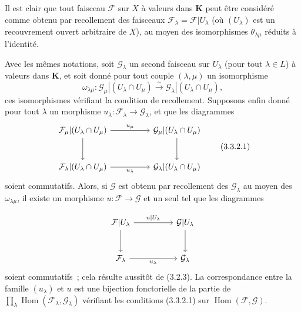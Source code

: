 \begin{env}[3.3.1]
Il est clair que tout faisceau $\mathcal{F}$ sur $X$ à valeurs dans
$\boldsymbol{K}$ peut être considéré comme obtenu par recollement des faisceaux
$\mathcal{F}_\lambda=\mathcal{F}|U_\lambda$ (où $(U_\lambda)$ est un
recouvrement ouvert arbitraire de $X$), au moyen des isomorphismes
$\theta_{\lambda\mu}$ réduits à l'identité.
\end{env}

\begin{env}[3.3.2]
\label{0.3.3.2-fr}
Avec les mêmes notations, soit $\mathcal{G}_\lambda$ un second faisceau sur
$U_\lambda$ (pour tout $\lambda\in L$) à valeurs dans $\boldsymbol{K}$, et soit
donné pour tout couple $(\lambda,\mu)$ un isomorphisme
\[
  \omega_{\lambda\mu}:
  \mathcal{G}_\mu|(U_\lambda\cap U_\mu)
  \xrightarrow{\sim}
  \mathcal{G}_\lambda|(U_\lambda\cap U_\mu),
\]
ces isomorphismes vérifiant la condition de recollement. Supposons enfin donné
pour tout $\lambda$ un morphisme
$u_\lambda:\mathcal{F}_\lambda\to\mathcal{G}_\lambda$, et que les diagrammes
\begin{equation}
\begin{tikzcd}[column sep=huge,row sep=large]
\mathcal{F}_\mu|(U_\lambda\cap U_\mu)
  \arrow[r,"u_\mu"] \arrow[d]
  & \mathcal{G}_\mu|(U_\lambda\cap U_\mu) \arrow[d] \\
\mathcal{F}_\lambda|(U_\lambda\cap U_\mu)
  \arrow[r,"u_\lambda"']
  & \mathcal{G}_\lambda|(U_\lambda\cap U_\mu)
\end{tikzcd}
\tag{3.3.2.1}\label{0.3.3.2.1-fr}
\end{equation}
soient commutatifs. Alors, si $\mathcal{G}$ est obtenu par recollement des
$\mathcal{G}_\lambda$ au moyen des $\omega_{\lambda\mu}$, il existe un
morphisme $u:\mathcal{F}\to\mathcal{G}$ et un seul tel que les diagrammes


\[
\begin{tikzcd}[column sep=huge,row sep=large]
\mathcal{F}|U_\lambda
  \arrow[r,"u|U_\lambda"] \arrow[d]
  & \mathcal{G}|U_\lambda \arrow[d] \\
\mathcal{F}_\lambda
  \arrow[r,"u_\lambda"']
  & \mathcal{G}_\lambda
\end{tikzcd}
\]
soient commutatifs~; cela résulte aussitôt de (3.2.3). La correspondance entre
la famille $(u_\lambda)$ et $u$ est une bijection fonctorielle de la partie de
$\prod_\lambda\operatorname{Hom}(\mathcal{F}_\lambda,\mathcal{G}_\lambda)$
vérifiant les conditions (3.3.2.1) sur
$\operatorname{Hom}(\mathcal{F},\mathcal{G})$.
\end{env}

